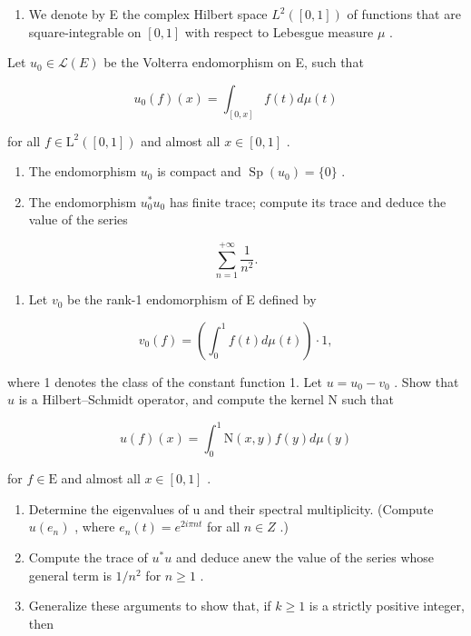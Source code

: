 \begin{enumerate}
\def\labelenumi{\arabic{enumi})}
\setcounter{enumi}{8}
\tightlist
\item
  We denote by E the complex Hilbert space \(L^{2}([0,1])\) of functions that are square-integrable on \([0,1]\) with respect to Lebesgue measure \(\mu\) .
\end{enumerate}

Let \(u_{0} \in \mathcal{L}(E)\) be the Volterra endomorphism on E, such that

\[
u _ {0} (f) (x) = \int_ {[ 0, x ]} f (t) d \mu (t)
\]

for all \(f \in \mathrm{L}^2([0,1])\) and almost all \(x \in [0,1]\) .

\begin{enumerate}
\def\labelenumi{\alph{enumi})}
\item
  The endomorphism \(u_{0}\) is compact and \(\operatorname{Sp}(u_{0})=\{0\}\) .
\item
  The endomorphism \(u_0^* u_0\) has finite trace; compute its trace and deduce the value of the series
\end{enumerate}

\[
\sum_ {n = 1} ^ {+ \infty} \frac {1}{n ^ {2}}.
\]

\begin{enumerate}
\def\labelenumi{\alph{enumi})}
\setcounter{enumi}{2}
\tightlist
\item
  Let \(v_{0}\) be the rank-1 endomorphism of E defined by
\end{enumerate}

\[
v _ {0} (f) = \left(\int_ {0} ^ {1} f (t) d \mu (t)\right) \cdot 1,
\]

where 1 denotes the class of the constant function 1. Let \(u = u_0 - v_0\) . Show that \(u\) is a Hilbert--Schmidt operator, and compute the kernel N such that

\[
u (f) (x) = \int_ {0} ^ {1} \mathrm{N} (x, y) f (y) d \mu (y)
\]

for \(f \in \mathrm{E}\) and almost all \(x \in [0,1]\) .

\begin{enumerate}
\def\labelenumi{\alph{enumi})}
\setcounter{enumi}{3}
\item
  Determine the eigenvalues of u and their spectral multiplicity. (Compute \(u(e_{n})\) , where \(e_{n}(t) = e^{2i\pi nt}\) for all \(n \in Z\) .)
\item
  Compute the trace of \(u^{*}u\) and deduce anew the value of the series whose general term is \(1/n^{2}\) for \(n \geqslant 1\) .
\item
  Generalize these arguments to show that, if \(k \geqslant 1\) is a strictly positive integer, then
\end{enumerate}

